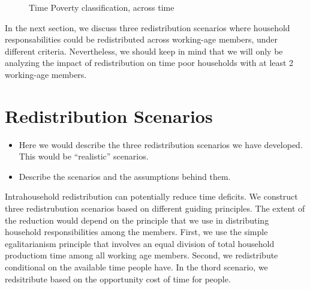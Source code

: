 \documentclass[
  11pt,
]{article}
\begin{document}
\begin{figure}


\caption{\label{fig-composition}Time Poverty classification, across
time}

\end{figure}%

In the next section, we discuss three redistribution scenarios where
household responsabilities could be redistributed across working-age
members, under different criteria. Nevertheless, we should keep in mind
that we will only be analyzing the impact of redistribution on time poor
households with at least 2 working-age members.

\section{Redistribution Scenarios}\label{redistribution-scenarios}

\begin{itemize}
\item
  Here we would describe the three redistribution scenarios we have
  developed. This would be ``realistic'' scenarios.
\item
  Describe the scenarios and the assumptions behind them.
\end{itemize}

Intrahousehold redistribution can potentially reduce time deficits. We
construct three redistrubution scenarios based on different guiding
principles. The extent of the reduction would depend on the principle
that we use in distributing household responsibilities among the
members. First, we use the simple egalitarianism principle that involves
an equal division of total household productiom time among all working
age members. Second, we redistribute conditional on the available time
people have. In the thord scenario, we redsitribute based on the
opportunity cost of time for people.
\end{document}
